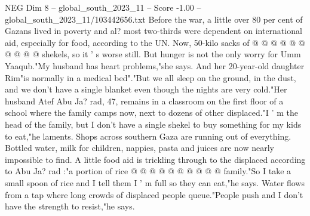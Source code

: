 \begin{textsample}{NEG Dim 8 – global\_south\_2023\_11 – Score -1.00 – global\_south\_2023\_11/103442656.txt}
Before the war, a little over 80 per cent of Gazans lived in poverty and al? most two-thirds were dependent on international aid, especially for food, according to the UN.
Now, 50-kilo sacks of @ @ @ @ @ @ @ @ @ @ shekels, so it ' s worse still.
But hunger is not the only worry for Umm Yaaqub."My husband has heart problems,"she says.
And her 20-year-old daughter Rim"is normally in a medical bed"."But we all sleep on the ground, in the dust, and we don't have a single blanket even though the nights are very cold."Her husband Atef Abu Ja? rad, 47, remains in a classroom on the first floor of a school where the family camps now, next to dozens of other displaced."I ' m the head of the family, but I don't have a single shekel to buy something for my kids to eat,"he laments.
Shops across southern Gaza are running out of everything.
Bottled water, milk for children, nappies, pasta and juices are now nearly impossible to find.
A little food aid is trickling through to the displaced according to Abu Ja? rad :"a portion of rice @ @ @ @ @ @ @ @ @ @ family."So I take a small spoon of rice and I tell them I ' m full so they can eat,"he says.
Water flows from a tap where long crowds of displaced people queue."People push and I don't have the strength to resist,"he says.

\end{textsample}
